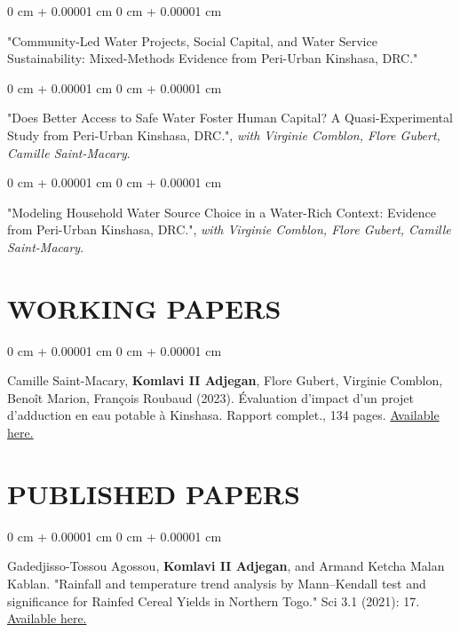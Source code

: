 \documentclass[10 pt, letterpaper]{article}
\newenvironment{onecolentry}{
    \begin{adjustwidth}{
        0 cm + 0.00001 cm
    }{
        0 cm + 0.00001 cm
    }
}{
    \end{adjustwidth}
} %
\begin{document}
        \begin{onecolentry}
        "Community-Led Water Projects, Social Capital, and Water Service Sustainability: Mixed-Methods Evidence from Peri-Urban Kinshasa, DRC."  
        \end{onecolentry}
        \vspace{0.25 cm}
        
        \begin{onecolentry}
        "Does Better Access to Safe Water Foster Human Capital? A Quasi-Experimental Study from Peri-Urban Kinshasa, DRC.", \textit{with Virginie Comblon, Flore Gubert, Camille Saint-Macary}.
        \end{onecolentry}
        \vspace{0.25 cm}
        
        \begin{onecolentry}
        "Modeling Household Water Source Choice in a Water-Rich Context: Evidence from Peri-Urban Kinshasa, DRC.", \textit{with Virginie Comblon, Flore Gubert, Camille Saint-Macary}.
        \end{onecolentry}
    
    \section{WORKING PAPERS}
        \begin{onecolentry}
        
        Camille Saint-Macary, \textbf{Komlavi II Adjegan}, Flore Gubert, Virginie Comblon, Benoît Marion, François Roubaud (2023). Évaluation d’impact d’un projet d’adduction en eau potable à Kinshasa. Rapport complet., 134 pages. \href{https://dial.ird.fr/wp-content/uploads/2023/10/2023-06_Evaluation_d-impact_projet_PILAEP2_-Rapport-complet_2023.pdf}{Available here.}
        \end{onecolentry}
        
    \section{PUBLISHED PAPERS}
        \begin{onecolentry}
        
        Gadedjisso-Tossou Agossou, \textbf{Komlavi II Adjegan}, and Armand Ketcha Malan Kablan. "Rainfall and temperature trend analysis by Mann–Kendall test and significance for Rainfed Cereal Yields in Northern Togo." Sci 3.1 (2021): 17. \href{https://www.mdpi.com/2413-4155/3/1/17}{Available here.}
        \end{onecolentry}
        
\end{document}
